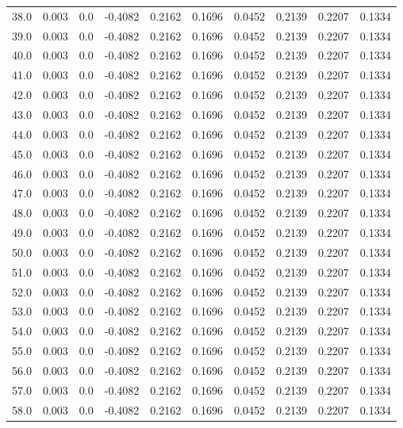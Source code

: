 \begin{longtable}{lrrrrrrrrr}
38.0 & 0.003 & 0.0 & -0.4082 & 0.2162 & 0.1696 & 0.0452 & 0.2139 & 0.2207 & 0.1334 \\
39.0 & 0.003 & 0.0 & -0.4082 & 0.2162 & 0.1696 & 0.0452 & 0.2139 & 0.2207 & 0.1334 \\
40.0 & 0.003 & 0.0 & -0.4082 & 0.2162 & 0.1696 & 0.0452 & 0.2139 & 0.2207 & 0.1334 \\
41.0 & 0.003 & 0.0 & -0.4082 & 0.2162 & 0.1696 & 0.0452 & 0.2139 & 0.2207 & 0.1334 \\
42.0 & 0.003 & 0.0 & -0.4082 & 0.2162 & 0.1696 & 0.0452 & 0.2139 & 0.2207 & 0.1334 \\
43.0 & 0.003 & 0.0 & -0.4082 & 0.2162 & 0.1696 & 0.0452 & 0.2139 & 0.2207 & 0.1334 \\
44.0 & 0.003 & 0.0 & -0.4082 & 0.2162 & 0.1696 & 0.0452 & 0.2139 & 0.2207 & 0.1334 \\
45.0 & 0.003 & 0.0 & -0.4082 & 0.2162 & 0.1696 & 0.0452 & 0.2139 & 0.2207 & 0.1334 \\
46.0 & 0.003 & 0.0 & -0.4082 & 0.2162 & 0.1696 & 0.0452 & 0.2139 & 0.2207 & 0.1334 \\
47.0 & 0.003 & 0.0 & -0.4082 & 0.2162 & 0.1696 & 0.0452 & 0.2139 & 0.2207 & 0.1334 \\
48.0 & 0.003 & 0.0 & -0.4082 & 0.2162 & 0.1696 & 0.0452 & 0.2139 & 0.2207 & 0.1334 \\
49.0 & 0.003 & 0.0 & -0.4082 & 0.2162 & 0.1696 & 0.0452 & 0.2139 & 0.2207 & 0.1334 \\
50.0 & 0.003 & 0.0 & -0.4082 & 0.2162 & 0.1696 & 0.0452 & 0.2139 & 0.2207 & 0.1334 \\
51.0 & 0.003 & 0.0 & -0.4082 & 0.2162 & 0.1696 & 0.0452 & 0.2139 & 0.2207 & 0.1334 \\
52.0 & 0.003 & 0.0 & -0.4082 & 0.2162 & 0.1696 & 0.0452 & 0.2139 & 0.2207 & 0.1334 \\
53.0 & 0.003 & 0.0 & -0.4082 & 0.2162 & 0.1696 & 0.0452 & 0.2139 & 0.2207 & 0.1334 \\
54.0 & 0.003 & 0.0 & -0.4082 & 0.2162 & 0.1696 & 0.0452 & 0.2139 & 0.2207 & 0.1334 \\
55.0 & 0.003 & 0.0 & -0.4082 & 0.2162 & 0.1696 & 0.0452 & 0.2139 & 0.2207 & 0.1334 \\
56.0 & 0.003 & 0.0 & -0.4082 & 0.2162 & 0.1696 & 0.0452 & 0.2139 & 0.2207 & 0.1334 \\
57.0 & 0.003 & 0.0 & -0.4082 & 0.2162 & 0.1696 & 0.0452 & 0.2139 & 0.2207 & 0.1334 \\
58.0 & 0.003 & 0.0 & -0.4082 & 0.2162 & 0.1696 & 0.0452 & 0.2139 & 0.2207 & 0.1334 \\

\end{longtable}
